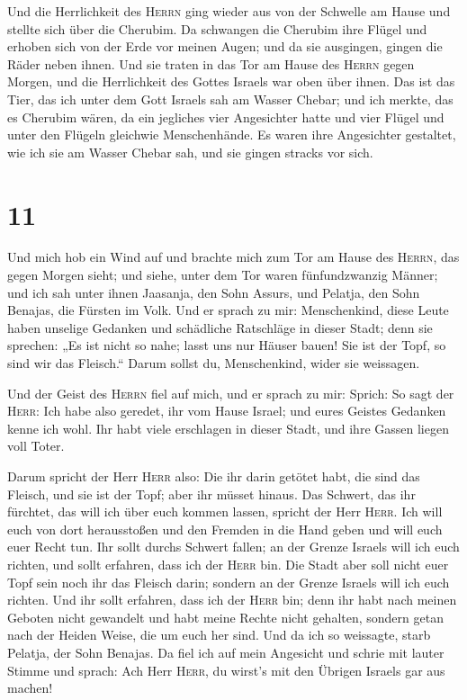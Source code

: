  Und die Herrlichkeit des \textsc{Herrn} ging wieder aus
von der Schwelle am Hause und stellte sich über die Cherubim.
 Da schwangen die Cherubim ihre Flügel und erhoben sich
von der Erde vor meinen Augen; und da sie ausgingen, gingen die Räder
neben ihnen. Und sie traten in das Tor am Hause des \textsc{Herrn} gegen
Morgen, und die Herrlichkeit des Gottes Israels war oben über ihnen.
 Das ist das Tier, das ich unter dem Gott Israels sah am
Wasser Chebar; und ich merkte, das es Cherubim wären,  da
ein jegliches vier Angesichter hatte und vier Flügel und unter den
Flügeln gleichwie Menschenhände.  Es waren ihre
Angesichter gestaltet, wie ich sie am Wasser Chebar sah, und sie gingen
stracks vor sich.

\hypertarget{section-10}{%
\section{11}\label{section-10}}

 Und mich hob ein Wind auf und brachte mich zum Tor am
Hause des \textsc{Herrn}, das gegen Morgen sieht; und siehe, unter dem
Tor waren fünfundzwanzig Männer; und ich sah unter ihnen Jaasanja, den
Sohn Assurs, und Pelatja, den Sohn Benajas, die Fürsten im Volk.
 Und er sprach zu mir: Menschenkind, diese Leute haben
unselige Gedanken und schädliche Ratschläge in dieser Stadt;
 denn sie sprechen: „Es ist nicht so nahe; lasst uns nur
Häuser bauen! Sie ist der Topf, so sind wir das Fleisch.``
 Darum sollst du, Menschenkind, wider sie weissagen.

 Und der Geist des \textsc{Herrn} fiel auf mich, und er
sprach zu mir: Sprich: So sagt der \textsc{Herr}: Ich habe also geredet,
ihr vom Hause Israel; und eures Geistes Gedanken kenne ich wohl.
 Ihr habt viele erschlagen in dieser Stadt, und ihre
Gassen liegen voll Toter.

 Darum spricht der Herr \textsc{Herr} also: Die ihr darin
getötet habt, die sind das Fleisch, und sie ist der Topf; aber ihr
müsset hinaus.  Das Schwert, das ihr fürchtet, das will
ich über euch kommen lassen, spricht der Herr \textsc{Herr}.
 Ich will euch von dort herausstoßen und den Fremden in
die Hand geben und will euch euer Recht tun.  Ihr sollt
durchs Schwert fallen; an der Grenze Israels will ich euch richten, und
sollt erfahren, dass ich der \textsc{Herr} bin.  Die
Stadt aber soll nicht euer Topf sein noch ihr das Fleisch darin; sondern
an der Grenze Israels will ich euch richten.  Und ihr
sollt erfahren, dass ich der \textsc{Herr} bin; denn ihr habt nach
meinen Geboten nicht gewandelt und habt meine Rechte nicht gehalten,
sondern getan nach der Heiden Weise, die um euch her sind.
 Und da ich so weissagte, starb Pelatja, der Sohn
Benajas. Da fiel ich auf mein Angesicht und schrie mit lauter Stimme und
sprach: Ach Herr \textsc{Herr}, du wirst's mit den Übrigen Israels gar
aus machen!

